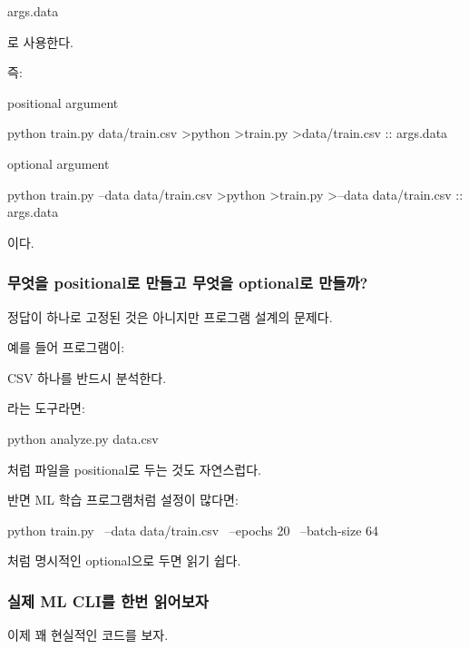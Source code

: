 \begin{dhkcode}
args.data
\end{dhkcode}

로 사용한다.

즉:

positional argument

\begin{dhktree}
python train.py data/train.csv
>python
>train.py
>data/train.csv :: args.data
\end{dhktree}

optional argument

\begin{dhktree}
python train.py --data data/train.csv
>python
>train.py
>--data data/train.csv :: args.data
\end{dhktree}


이다.

\subsubsection{무엇을 positional로 만들고 무엇을 optional로 만들까?}

정답이 하나로 고정된 것은 아니지만 프로그램 설계의 문제다.

예를 들어 프로그램이:

\begin{dhksmry}[centered]
CSV 하나를 반드시 분석한다.
\end{dhksmry}

라는 도구라면:

\begin{dhkzsh}
python analyze.py data.csv
\end{dhkzsh}

처럼 파일을 positional로 두는 것도 자연스럽다.

반면 ML 학습 프로그램처럼 설정이 많다면:

\begin{dhkzsh}
python train.py \
    --data data/train.csv \
    --epochs 20 \
    --batch-size 64
\end{dhkzsh}

처럼 명시적인 optional으로 두면 읽기 쉽다.

\subsubsection{실제 ML CLI를 한번 읽어보자}

이제 꽤 현실적인 코드를 보자.

